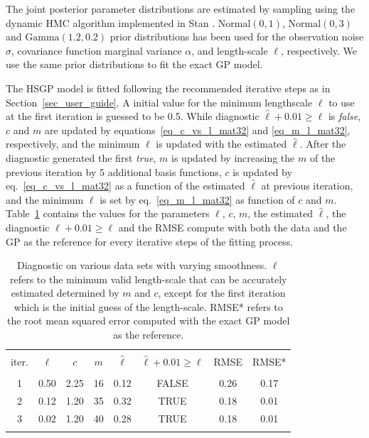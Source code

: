 The joint posterior parameter distributions are estimated by sampling using the dynamic HMC algorithm implemented in Stan \citep{StanTeam:2021}. $\mathrm{Normal}(0,1)$, \linebreak $\mathrm{Normal}(0,3)$ and $\mathrm{Gamma}(1.2,0.2)$ prior distributions has been used for the observation noise $\sigma$, covariance function marginal variance $\alpha$, and length-scale $\ell$, respectively. We use the same prior distributions to fit the exact GP model.

The HSGP model is fitted following the recommended iterative steps as in Section~\ref{sec_user_guide}. A initial value for the minimum lengthscale $\ell$ to use at the first iteration is guessed to be 0.5. While diagnostic $\hat{\ell} + 0.01 \geq \ell$ is \textit{false}, $c$ and $m$ are updated by equations~\eqref{eq_c_vs_l_mat32} and \eqref{eq_m_l_mat32}, respectively, and the minimum $\ell$ is updated with the estimated $\hat{\ell}$. After the diagnostic generated the first \textit{true}, $m$ is updated by increasing the $m$ of the previous iteration by 5 additional basis functions, $c$ is updated by eq.~\eqref{eq_c_vs_l_mat32} as a function of the estimated $\hat{\ell}$ at previous iteration, and the minimum $\ell$ is set by eq.~\eqref{eq_m_l_mat32} as function of $c$ and $m$. Table~\ref{tab_caseI} contains the values for the parameters $\ell$, $c$, $m$, the estimated $\hat{\ell}$, the diagnostic $\hat{\ell} + 0.01 \geq \ell$ and the RMSE compute with both the data and the GP as the reference for every iterative steps of the fitting process.

\begin{table}
\centering
\setlength{\tabcolsep}{4pt}
\begin{tabular}{cccccccc}
\arrayrulecolor{gray}\hline \\[-3mm]
iter. & $\ell$ & $c$ & $m$ & $\hat{\ell}$ & $\hat{\ell} + 0.01 \geq \ell$ & RMSE & RMSE* \\ 
\arrayrulecolor{lightgray}\hline \\[-1mm]
 1 & 0.50 & 2.25 & 16 & 0.12 & FALSE & 0.26 & 0.17 \\
 2 & 0.12 & 1.20 & 35 & 0.32 & TRUE & 0.18 & 0.01 \\
 3 & 0.02 & 1.20 & 40 & 0.28 & TRUE & 0.18 & 0.01 \\[1mm]
\arrayrulecolor{gray}\hline
\end{tabular}
\caption{Diagnostic on various data sets with varying smoothness. $\ell$ refers to the minimum valid length-scale that can be accurately estimated determined by $m$ and $c$, except for the first iteration which is the initial guess of the length-scale. RMSE* refers to the root mean squared error computed with the exact GP model as the reference.}
  \label{tab_caseI}
\end{table}

